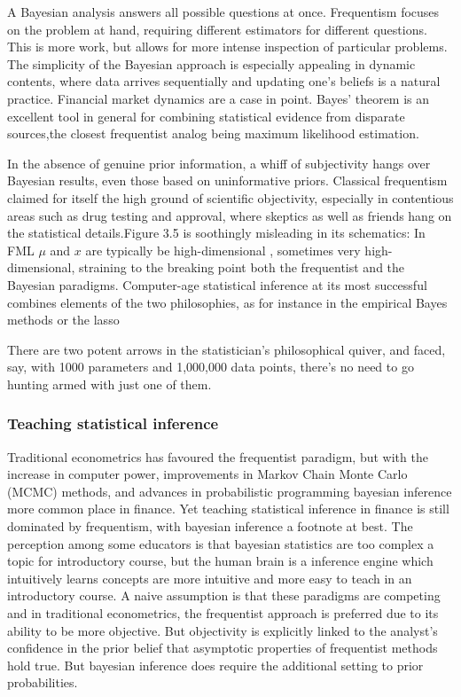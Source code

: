 \documentclass{article}
\begin{document}
A Bayesian analysis answers all possible questions at once. Frequentism
focuses on the problem at hand, requiring different estimators for
different questions. This is more work, but allows for more intense
inspection of particular problems. The simplicity of the Bayesian
approach is especially appealing in dynamic contents, where data arrives
sequentially and updating one's beliefs is a natural practice. Financial
market dynamics are a case in point. Bayes' theorem is an excellent tool
in general for combining statistical evidence from disparate sources,the
closest frequentist analog being maximum likelihood estimation.

In the absence of genuine prior information, a whiff of subjectivity
hangs over Bayesian results, even those based on uninformative priors.
Classical frequentism claimed for itself the high ground of scientific
objectivity, especially in contentious areas such as drug testing and
approval, where skeptics as well as friends hang on the statistical
details.Figure 3.5 is soothingly misleading in its schematics: In FML
\(\mu\) and \(x\) are typically be high-dimensional , sometimes very
high-dimensional, straining to the breaking point both the frequentist
and the Bayesian paradigms. Computer-age statistical inference at its
most successful combines elements of the two philosophies, as for
instance in the empirical Bayes methods or the lasso

There are two potent arrows in the statistician's philosophical quiver,
and faced, say, with 1000 parameters and 1,000,000 data points, there's
no need to go hunting armed with just one of them.

\hypertarget{teaching-statistical-inference}{%
\subsubsection{Teaching statistical
inference}\label{teaching-statistical-inference}}

Traditional econometrics has favoured the frequentist paradigm, but with
the increase in computer power, improvements in Markov Chain Monte Carlo
(MCMC) methods, and advances in probabilistic programming bayesian
inference more common place in finance. Yet teaching statistical
inference in finance is still dominated by frequentism, with bayesian
inference a footnote at best. The perception among some educators is
that bayesian statistics are too complex a topic for introductory
course, but the human brain is a inference engine which intuitively
learns concepts are more intuitive and more easy to teach in an
introductory course. A naive assumption is that these paradigms are
competing and in traditional econometrics, the frequentist approach is
preferred due to its ability to be more objective. But objectivity is
explicitly linked to the analyst's confidence in the prior belief that
asymptotic properties of frequentist methods hold true. But bayesian
inference does require the additional setting to prior probabilities.
\end{document}
